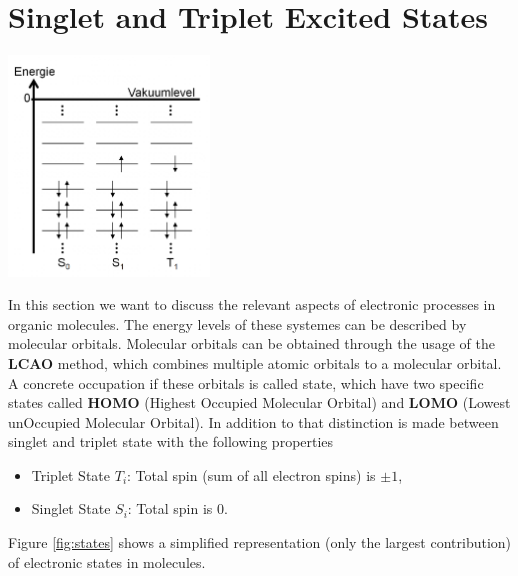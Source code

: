 \section{Singlet and Triplet Excited States}
\label{sec:excitedStates}

\begin{center}
    \captionsetup{type = figure}
    \includegraphics[width = 0.4\textwidth]{Pictures/Excited-States.png}
    \label{fig:states}
\end{center}

In this section we want to discuss the relevant aspects of electronic processes in organic molecules. The energy levels of these systemes can be described by molecular orbitals. Molecular orbitals can be obtained through the usage of the \textbf{LCAO} method, which combines multiple atomic orbitals to a molecular orbital. A concrete occupation if these orbitals is called state, which have two specific states called \textbf{HOMO} (Highest Occupied Molecular Orbital) and \textbf{LOMO} (Lowest unOccupied Molecular Orbital). In addition to that distinction is made between singlet and triplet state with the following properties
\begin{itemize}
    \item Triplet State $T_i$: Total spin (sum of all electron spins) is $\pm 1$, 
    \item Singlet State $S_i$: Total spin is 0.
\end{itemize}
Figure \ref{fig:states} shows a simplified representation (only the largest contribution) of electronic states in molecules. 

